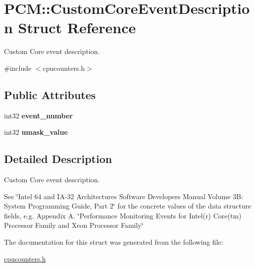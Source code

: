 \hypertarget{struct_p_c_m_1_1_custom_core_event_description}{}\section{P\+CM\+:\+:Custom\+Core\+Event\+Description Struct Reference}
\label{struct_p_c_m_1_1_custom_core_event_description}


Custom Core event description.  




{\ttfamily \#include $<$cpucounters.\+h$>$}

\subsection*{Public Attributes}
\begin{DoxyCompactItemize}
\item 
\mbox{\label{struct_p_c_m_1_1_custom_core_event_description_adfdbff9cf7c5be78450884b7adbd48fb}} 
int32 {\bfseries event\+\_\+number}
\item 
\mbox{\label{struct_p_c_m_1_1_custom_core_event_description_a317a16603c27cf815fa62d88e7fd2f61}} 
int32 {\bfseries umask\+\_\+value}
\end{DoxyCompactItemize}


\subsection{Detailed Description}
Custom Core event description. 

See \char`\"{}\+Intel 64 and I\+A-\/32 Architectures Software Developers Manual Volume 3\+B\+:
\+System Programming Guide, Part 2\char`\"{} for the concrete values of the data structure fields, e.\+g. Appendix A. \char`\"{}\+Performance Monitoring Events for Intel(r) Core(tm) Processor Family
and Xeon Processor Family\char`\"{} 

The documentation for this struct was generated from the following file\+:\begin{DoxyCompactItemize}
\item 
\mbox{\hyperlink{cpucounters_8h}{cpucounters.\+h}}\end{DoxyCompactItemize}
